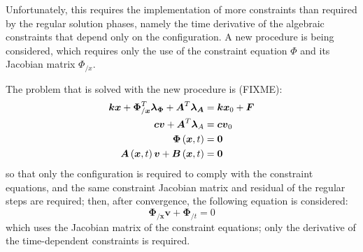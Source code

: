 \documentclass[10pt,dvips,fleqn,subeqn]{report}
\newcommand{\T}[1]{\boldsymbol{#1}}
\begin{document}
Unfortunately, this requires the implementation of more constraints
than required by the regular solution phases, namely the time derivative
of the algebraic constraints that depend only on the configuration.
A new procedure is being considered, which requires only the use 
of the constraint equation $\Phi$ and its Jacobian matrix $\Phi_{/x}$.

The problem that is solved with the new procedure is (FIXME):
\begin{align}
	\T{k} \T{x} + \T{\Phi}_{/\T{x}}^T \T{\lambda}_{\T{\Phi}} + \T{A}^T \T{\lambda}_{\T{A}} 
		& = \T{k} \T{x}_0 + \T{F} \\
	\T{c} \T{v} + \T{A}^T \T{\lambda}_{A} & = \T{c} \T{v}_0 \\
	\T{\Phi}\plbr{\T{x}, t} & = \T{0} \\
	\T{A}\plbr{\T{x}, t} \T{v} + \T{B}\plbr{\T{x}, t} & = \T{0}
\end{align}
so that only the configuration is required to comply 
with the constraint equations, and the same constraint 
Jacobian matrix and residual of the regular steps are required;
then, after convergence, the following equation is considered:
\begin{equation}
	\T{\Phi}_{/\T{x}} \T{v} + \T{\Phi}_{/t} = 0
\end{equation}
which uses the Jacobian matrix of the constraint equations; 
only the derivative of the time-dependent constraints is required.
\end{document}

